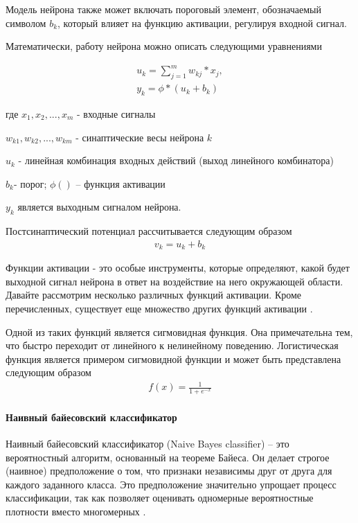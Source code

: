 Модель нейрона также может включать пороговый элемент, обозначаемый символом  $b_k$, который влияет на функцию активации, регулируя входной сигнал.

Математически, работу нейрона можно описать следующими уравнениями

\begin{gather}
    u_k = \displaystyle\sum_{j=1}^{m} w_{kj} * x_j, \\
    y_k = \phi * (u_k + b_k)
\end{gather}

где $x_1, x_2, ... , x_m$ - входные сигналы 

$w_{k1}, w_{k2}, ... , w_{km}$ - синаптические весы нейрона $k$

$u_k$ - линейная комбинация входных действий (выход линейного комбинатора)

$b_k$- порог; $\phi()$ – функция активации

$y_k$ является выходным сигналом нейрона.

Постсинаптический потенциал рассчитывается следующим образом
\begin{gather}
    v_k = u_k + b_k
\end{gather}

Функции активации - это особые инструменты, которые определяют, какой будет выходной сигнал нейрона в ответ на воздействие на него окружающей области. Давайте рассмотрим несколько различных функций активации. Кроме перечисленных, существует еще множество других функций активации .

Одной из таких функций является сигмовидная функция. Она примечательна тем, что быстро переходит от линейного к нелинейному поведению. Логистическая функция является примером сигмовидной функции и может быть представлена следующим образом
\begin{gather}
    f(x) = \frac{1}{1 + e^{-x}}
\end{gather}

\paragraph{Наивный байесовский классификатор}

Наивный байесовский классификатор (Naive Bayes classifier) – это вероятностный алгоритм, основанный на теореме Байеса. Он делает строгое (наивное) предположение о том, что признаки независимы друг от друга для каждого заданного класса. Это предположение значительно упрощает процесс классификации, так как позволяет оценивать одномерные вероятностные плотности вместо многомерных .

